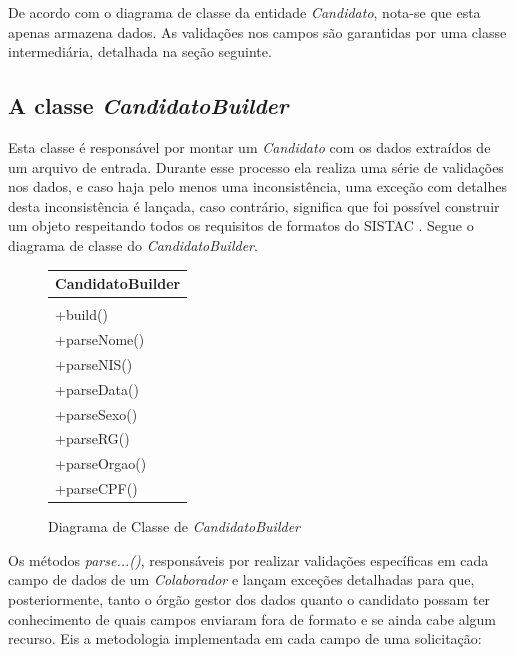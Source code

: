 \documentclass[
	12pt,			%
	openright,		%
	oneside,	
	a4paper,		%
	english,		%
	brazil			%
]{abntex2/abntex2}  %
\begin{document}
				De acordo com o diagrama de classe da entidade \textit{Candidato}, nota-se que esta apenas armazena dados. As validações nos campos são garantidas por uma classe intermediária, detalhada na seção seguinte.
	
			\subsection{A classe \textit{CandidatoBuilder}} \label{candidato-builder}
				
				Esta classe é responsável por montar um \textit{Candidato} com os dados extraídos de um arquivo de entrada. Durante esse processo ela realiza uma série de validações nos dados, e caso haja pelo menos uma inconsistência, uma exceção com detalhes desta inconsistência é lançada, caso contrário, significa que foi possível construir um objeto respeitando todos os requisitos de formatos do SISTAC \cite{sistac-formatos}. Segue o diagrama de classe do \textit{CandidatoBuilder}.
				
				\begin{figure}[ht]
					\begin{center}
						
						\caption{Diagrama de Classe de \textit{CandidatoBuilder}}
						\label{candidatobuilder-uml}
						
						\begin{tabular}{|l|}
							\hline
							\multicolumn{1}{|c|}{\textbf{CandidatoBuilder}} \\ \hline
							\\ \hline
							+build() \\
							+parseNome() \\
							+parseNIS() \\
							+parseData() \\
							+parseSexo() \\
							+parseRG() \\
							+parseOrgao() \\
							+parseCPF() \\ \hline
						\end{tabular}
					
					\end{center}
				\end{figure}
	
				Os métodos \textit{parse...()}, responsáveis por realizar validações específicas em cada campo de dados de um \textit{Colaborador} e lançam exceções detalhadas para que, posteriormente, tanto o órgão gestor dos dados quanto o candidato possam ter conhecimento de quais campos enviaram fora de formato e se ainda cabe algum recurso. Eis a metodologia implementada em cada campo de uma solicitação:
				
\end{document}
